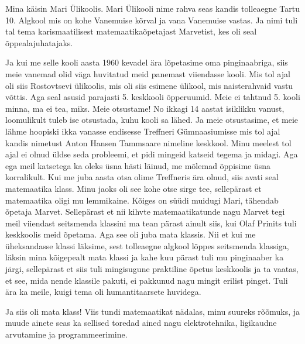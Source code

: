 

Mina käisin Mari Ülikoolis. Mari Ülikooli nime rahva seas kandis tolleaegne Tartu 10. Algkool mis on kohe Vanemuise kõrval ja vana Vanemuise vastas. Ja nimi tuli tal tema karismaatilisest matemaatikaõpetajast Marvetist, kes oli seal õppealajuhatajaks.

Ja kui me selle kooli aasta 1960 kevadel ära lõpetasime oma pinginaabriga, siis meie vanemad olid väga huvitatud meid panemast viiendasse kooli. Mis tol ajal oli siis Rostovtsevi ülikoolis, mis oli siis esimene ülikool, mis naisterahvaid vastu võttis. Aga seal asusid parajasti 5. keskkooli õpperuumid. Meie ei tahtnud 5. kooli minna, ma ei tea, miks. Meie otsustame! No ikkagi 14 aastat isiklikku vanust, loomulikult tuleb ise otsustada, kuhu kooli sa lähed. Ja meie otsustasime, et meie lähme hoopiski ikka vanasse endisesse Treffneri Gümnaasiumisse mis tol ajal kandis nimetust Anton Hansen Tammsaare nimeline keskkool. Minu meelest tol ajal ei olnud üldse seda probleemi, et pidi mingeid katseid tegema ja midagi. Aga ega meil katsetega ka oleks üsna hästi läinud, me mõlemad õppisime üsna korralikult. Kui me juba aasta otsa olime Treffneris ära olnud, siis avati seal matemaatika klass. Minu jaoks oli see kohe otse sirge tee, sellepärast et matemaatika oligi mu lemmikaine. Kõiges on süüdi muidugi Mari, tähendab õpetaja Marvet. Sellepärast et nii kihvte matemaatikatunde nagu Marvet tegi meil viiendast seitsmenda klassini ma tean pärast ainult siis, kui Olaf Prinits tuli keskkoolis meid õpetama. Aga see oli juba mata klassis. Nii et kui me üheksandasse klassi läksime, sest tolleaegne algkool lõppes seitsmenda klassiga, läksin mina kõigepealt mata klassi ja kahe kuu pärast tuli mu pinginaaber ka järgi, sellepärast et siis tuli mingisugune praktiline õpetus keskkoolis ja  ta vaatas, et see, mida nende klassile pakuti, ei pakkunud nagu mingit erilist pinget. Tuli ära ka meile, kuigi tema oli humantitaarsete huvidega. 

Ja siis oli mata klass! Viis tundi matemaatikat nädalas, minu suureks rõõmuks, ja muude ainete seas ka sellised toredad ained nagu elektrotehnika, ligikaudne arvutamine ja programmeerimine. 

